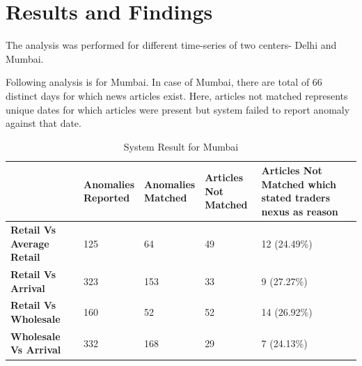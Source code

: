 \chapter{Results and Findings}

The analysis was performed for different time-series of two centers- Delhi and Mumbai.

Following analysis is for Mumbai. In case of Mumbai, there are total of 66 distinct days for which news articles exist. Here, articles not matched represents unique dates for which articles were present but system failed to report anomaly against that date.

\begin{table}[H]
\centering

\begin{tabular}{| L{3cm} | L{3cm} | L{3cm} | L{3cm} | L{3cm} |}
\hline                                 
				  & \textbf{Anomalies \newline Reported} & \textbf{Anomalies \newline Matched}  & \textbf{Articles \newline Not Matched}   & \textbf{Articles Not Matched which stated traders nexus as reason} \\ \hline
\textbf{Retail Vs Average Retail} & 125                         & 64                          &  49                		&  12 (24.49\%)                \\ \hline
\textbf{Retail Vs Arrival}        & 323                         & 153                         &  33                		&  9  (27.27\%)              \\ \hline
\textbf{Retail Vs Wholesale}      & 160                         & 52                          &  52                		&  14 (26.92\%)               \\ \hline
\textbf{Wholesale Vs Arrival}     & 332                         & 168                         &  29                		&  7  (24.13\%)              \\ \hline
\end{tabular}
\caption{System Result for Mumbai}
\label{result}
\end{table}


